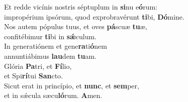 \oddverse Et redde vicínis nostris séptuplum in \textbf{si}nu e\textbf{ó}rum:~\*\\
\oddverse impropérium ipsórum, quod exprobravérunt \textbf{ti}bi, \textbf{Dó}mine.\\
\evenverse Nos autem pópulus tuus, et oves \textbf{pá}scuæ \textbf{tu}æ,~\*\\
\evenverse confitébimur \textbf{ti}bi in \textbf{sǽ}culum.\\
\oddverse In generatiónem et gene\textbf{ra}ti\textbf{ó}nem~\*\\
\oddverse annuntiábimus \textbf{lau}dem \textbf{tu}am.\\
\evenverse Glória \textbf{Pa}tri, et \textbf{Fí}lio,~\*\\
\evenverse et Spi\textbf{rí}tui \textbf{San}cto.\\
\oddverse Sicut erat in princípio, et \textbf{nunc}, et \textbf{sem}per,~\*\\
\oddverse et in sǽcula sæcu\textbf{ló}rum. \textbf{A}men.\\
